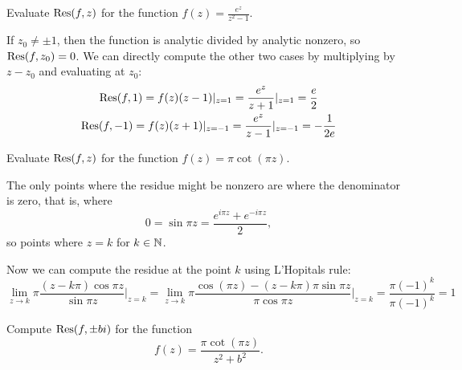 \documentclass{homework}
\begin{document}
      \begin{problem}
        Evaluate $\operatorname{Res}(f,z)$ for the function $f(z) = \displaystyle\frac{e^z}{z^2-1}$.
        \end{problem}
        \begin{solution}
        If $z_0\neq \pm 1$, then the function is analytic divided by analytic nonzero, so $\operatorname{Res}(f,z_0)=0$. We can directly compute the other two cases by multiplying by $z-z_0$ and evaluating at $z_0$:
        \begin{gather*}
        \operatorname{Res}(f,1) = f(z)(z-1)|_{z=1} = \frac{e^z}{z+1}|_{z=1} = \frac{e}{2}\\
        \operatorname{Res}(f,-1) = f(z)(z+1)|_{z=-1} = \frac{e^z}{z-1}|_{z=-1} = -\frac{1}{2e}
        \end{gather*}
        \end{solution}
        \begin{problem}\label{residues-all-one}
        Evaluate $\operatorname{Res}(f,z)$ for the
          function $f(z) = \pi \cot (\pi z)$.
          \end{problem}
          \begin{solution}
          The only points where the residue might be nonzero are where the denominator is zero, that is, where
          \[
              0=\sin \pi z = \frac{e^{i\pi z}+e^{-i\pi z}}{2},
              \]
              so points where $z = k$ for $k\in \mathbb{N}$.

              Now we can compute the residue at the point $k$ using L'Hopitals rule:
              \[
              \lim_{z\to k} \pi\frac{(z-k\pi)\cos \pi z}{\sin \pi z}\big|_{z=k} = \lim_{z\to k}\pi \frac{\cos (\pi z) -  (z-k\pi)\pi \sin \pi z}{\pi\cos \pi z}\big|_{z=k} = \frac{\pi(-1)^k}{\pi (-1)^k} = 1
              \]
              \end{solution}
              \begin{problem}\label{residue-coth}Compute $\operatorname{Res}(f,\pm bi)$ for the
                function
                  \[
                      f(z) = \frac{\pi \cot(\pi z)}{z^2 + b^2}.
                        \]
                        \end{problem}
\end{document}
